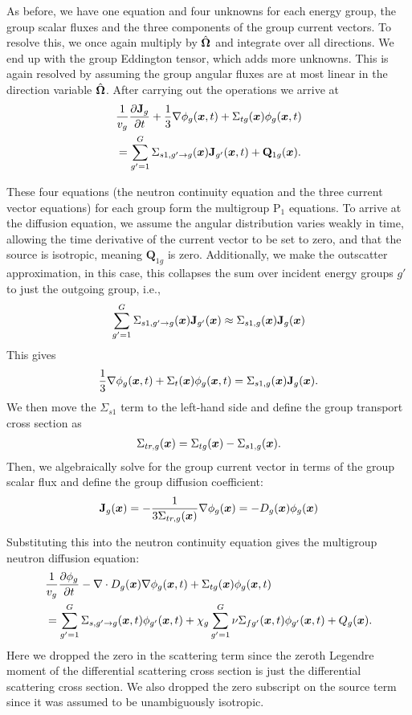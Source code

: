 As before, we have one equation and four unknowns for each energy group, the group scalar fluxes and the three components of the group current vectors. To resolve this, we once again multiply by $\hat{\mathbf{\Omega}}$ and integrate over all directions. We end up with the group Eddington tensor, which adds more unknowns. This is again resolved by assuming the group angular fluxes are at most linear in the direction variable $\hat{\mathbf{\Omega}}$. After carrying out the operations we arrive at
\begin{align}
  &\frac{1}{v_g} \frac{ \partial {\mathbf{J}_g} }{ \partial {t} } + \frac{1}{3} \nabla \phi_g(\bm{x},t) + \Sigma_{tg}(\bm{x}) \phi_g(\bm{x},t) \nonumber \\*
  &= \sum_{g'=1}^G  \Sigma_{s1,g' \rightarrow g}(\bm{x}) \mathbf{J}_{g'}(\bm{x},t)  + \mathbf{Q}_{1g}(\bm{x}) .
\end{align}

These four equations (the neutron continuity equation and the three current vector equations) for each group form the multigroup P$_1$ equations. To arrive at the diffusion equation, we assume the angular distribution varies weakly in time, allowing the time derivative of the current vector to be set to zero, and that the source is isotropic, meaning $\mathbf{Q}_{1g}$ is zero. Additionally, we make the outscatter approximation, in this case, this collapses the sum over incident energy groups $g'$ to just the outgoing group, i.e.,
\begin{align}
  \sum_{g'=1}^G  \Sigma_{s1,g' \rightarrow g}(\bm{x}) \mathbf{J}_{g'}(\bm{x}) \approx \Sigma_{s1,g}(\bm{x}) \mathbf{J}_g(\bm{x})
\end{align}
This gives
\begin{align}
  \frac{1}{3} \nabla \phi_g(\bm{x},t) + \Sigma_t(\bm{x}) \phi_g(\bm{x},t) = \Sigma_{s1,g}(\bm{x}) \mathbf{J}_g(\bm{x}) .
\end{align}
We then move the $\Sigma_{s1}$ term to the left-hand side and define the group transport cross section as
\begin{align}
  \Sigma_{tr,g}(\bm{x}) = \Sigma_{tg}(\bm{x}) - \Sigma_{s1,g}(\bm{x}).
\end{align}
Then, we algebraically solve for the group current vector in terms of the group scalar flux and define the group diffusion coefficient:
\begin{align}
  \mathbf{J}_g(\bm{x}) = -\frac{1}{3 \Sigma_{tr,g}(\bm{x})} \nabla \phi_g(\bm{x}) = -D_g(\bm{x}) \phi_g(\bm{x})
\end{align}

Substituting this into the neutron continuity equation gives the multigroup neutron diffusion equation:
\begin{align}
  &\frac{1}{v_g} \frac{ \partial {\phi_g} }{ \partial {t} } - \nabla \cdot D_g(\bm{x}) \nabla \phi_g(\bm{x},t) + \Sigma_{tg}(\bm{x}) \phi_g(\bm{x},t) \nonumber \\*
  &= \sum_{g'=1}^G  \Sigma_{s,g' \rightarrow g}(\bm{x},t) \phi_{g'}(\bm{x},t) + \chi_g \sum_{g'=1}^G   \nu\Sigma_{fg'}(\bm{x},t) \phi_{g'}(\bm{x},t) + Q_{g}(\bm{x}) .
\end{align}
Here we dropped the zero in the scattering term since the zeroth Legendre moment of the differential scattering cross section is just the differential scattering cross section. We also dropped the zero subscript on the source term since it was assumed to be unambiguously isotropic.

